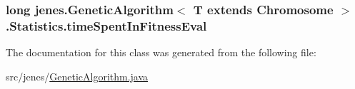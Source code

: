 \hypertarget{classjenes_1_1_genetic_algorithm_3_01_t_01extends_01_chromosome_01_4_1_1_statistics_ac3d2df83ba0389f8d22e7d75c02ed03a}{
\subsubsection[{time\-Spent\-In\-Fitness\-Eval}]{\setlength{\rightskip}{0pt plus 5cm}long jenes.\-Genetic\-Algorithm$<$ T extends Chromosome $>$.Statistics.\-time\-Spent\-In\-Fitness\-Eval\hspace{0.3cm}{\ttfamily [private]}}}\label{classjenes_1_1_genetic_algorithm_3_01_t_01extends_01_chromosome_01_4_1_1_statistics_ac3d2df83ba0389f8d22e7d75c02ed03a}


The documentation for this class was generated from the following file\-:\begin{DoxyCompactItemize}
\item 
src/jenes/\hyperlink{_genetic_algorithm_8java}{Genetic\-Algorithm.\-java}\end{DoxyCompactItemize}
